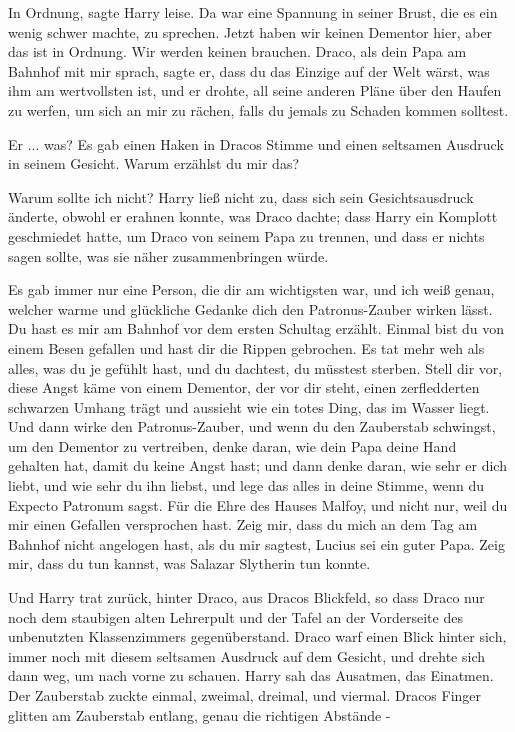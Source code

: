 \glqq{}In Ordnung\grqq{}, sagte Harry leise. Da war eine Spannung in seiner
Brust, die es ein wenig schwer machte, zu sprechen. \glqq{}Jetzt haben wir keinen
Dementor hier, aber das ist in Ordnung. Wir werden keinen brauchen. Draco, als
dein Papa am Bahnhof mit mir sprach, sagte er, dass du das Einzige auf der Welt
wärst, was ihm am wertvollsten ist, und er drohte, all seine anderen Pläne über
den Haufen zu werfen, um sich an mir zu rächen, falls du jemals zu Schaden
kommen solltest.\grqq{}

\glqq{}Er ... was?\grqq{} Es gab einen Haken in Dracos Stimme und einen seltsamen
Ausdruck in seinem Gesicht. \glqq{}Warum erzählst du mir das?\grqq{}

\glqq{}Warum sollte ich nicht?\grqq{} Harry ließ nicht zu, dass sich sein
Gesichtsausdruck änderte, obwohl er erahnen konnte, was Draco dachte; dass Harry
ein Komplott geschmiedet hatte, um Draco von seinem Papa zu trennen, und dass
er nichts sagen sollte, was sie näher zusammenbringen würde.

\glqq{}Es gab immer nur eine Person, die dir am wichtigsten war, und ich weiß
genau, welcher warme und glückliche Gedanke dich den Patronus-Zauber wirken
lässt. Du hast es mir am Bahnhof vor dem ersten Schultag erzählt. Einmal bist du
von einem Besen gefallen und hast dir die Rippen gebrochen. Es tat mehr weh als
alles, was du je gefühlt hast, und du dachtest, du müsstest sterben. Stell dir
vor, diese Angst käme von einem Dementor, der vor dir steht, einen zerfledderten
schwarzen Umhang trägt und aussieht wie ein totes Ding, das im Wasser liegt. Und
dann wirke den Patronus-Zauber, und wenn du den Zauberstab schwingst, um den
Dementor zu vertreiben, denke daran, wie dein Papa deine Hand gehalten hat,
damit du keine Angst hast; und dann denke daran, wie sehr er dich liebt, und wie
sehr du ihn liebst, und lege das alles in deine Stimme, wenn du Expecto Patronum
sagst. Für die Ehre des Hauses Malfoy, und nicht nur, weil du mir einen Gefallen
versprochen hast. Zeig mir, dass du mich an dem Tag am Bahnhof nicht angelogen
hast, als du mir sagtest, Lucius sei ein guter Papa. Zeig mir, dass du tun
kannst, was Salazar Slytherin tun konnte.\grqq{}

Und Harry trat zurück, hinter Draco, aus Dracos Blickfeld, so dass Draco nur
noch dem staubigen alten Lehrerpult und der Tafel an der Vorderseite des
unbenutzten Klassenzimmers gegenüberstand. Draco warf einen Blick hinter sich,
immer noch mit diesem seltsamen Ausdruck auf dem Gesicht, und drehte sich dann
weg, um nach vorne zu schauen. Harry sah das Ausatmen, das Einatmen. Der
Zauberstab zuckte einmal, zweimal, dreimal, und viermal. Dracos Finger glitten
am Zauberstab entlang, genau die richtigen Abstände -

